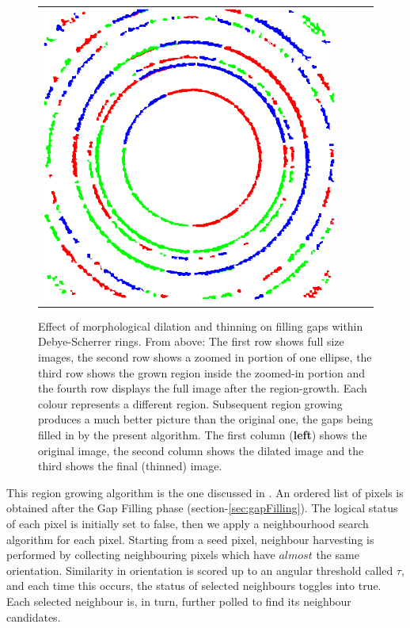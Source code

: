 \documentclass[preprint]{iucr}              %
\newcommand\dsrs{Debye-Scherrer rings}
\begin{document}
\begin{figure}
\begin{tabular}{>{\centering\arraybackslash}m{.1\linewidth}>{\centering\arraybackslash}m{.25\linewidth}>{\centering\arraybackslash}m{.25\linewidth}>{\centering\arraybackslash}m{.25\linewidth}}
\includegraphics[width=\linewidth]{Detail/o_max1_Regs_aftr_thin.png}
\end{tabular}

\caption{Effect of morphological dilation and thinning on filling gaps within {\dsrs}. From above: The first row shows full size images, the second row shows a zoomed in portion of one ellipse, the third row shows the grown region inside the zoomed-in portion and the fourth row displays the full image after the region-growth. Each colour represents a different region. Subsequent region growing produces a much better picture than the original one, the gaps being filled in by the present algorithm. The first column (\textbf{left}) shows the original image, the second column shows the dilated image and the third shows the final (thinned) image.}

\label{fig:Dilt_Thin}
\end{figure}


This region growing algorithm is the one discussed in \cite{puatruaucean12A}. An ordered list of pixels is obtained after the Gap Filling phase (section-\ref{sec:gapFilling}). The logical status of each pixel is initially set to false, then we apply a neighbourhood search algorithm for each pixel. Starting from a seed pixel, neighbour harvesting is performed by collecting neighbouring pixels which have $almost$ the same orientation. Similarity in orientation is scored up to an angular threshold called $\tau$, and each time this occurs, the status of selected neighbours toggles into true. Each selected neighbour is, in turn, further polled to find its neighbour candidates. 
\end{document}
